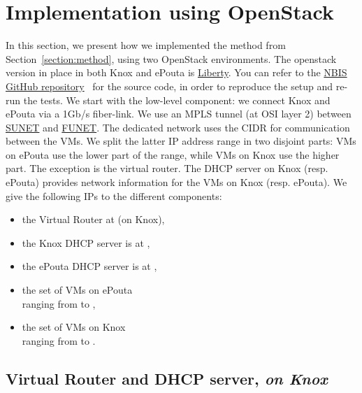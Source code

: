 \section{Implementation using OpenStack}
\label{section:implementation}

In this section, we present how we implemented the method from
Section~\ref{section:method}, using two OpenStack environments.
%
The openstack version in place in both Knox and ePouta is
\href{http://docs.openstack.org/liberty/install-guide-ubuntu/}{Liberty}.
%
%
You can refer to the
\href{https://github.com/NBISweden/Knox-ePouta}{NBIS GitHub
  repository}~\cite{nbis-knox-epouta} for the source code, in order to
reproduce the setup and re-run the tests.
%
We start with the low-level component: we connect Knox
and ePouta via a 1Gb/s fiber-link.
%
We use an MPLS tunnel (at OSI layer 2) between
\href{https://www.sunet.se/}{SUNET} and
\href{https://www.csc.fi/funet-network-services}{FUNET}.
%
The dedicated network uses the  CIDR for communication
between the VMs.
%
We split the latter IP address range in two disjoint parts: VMs on
ePouta use the lower part of the range, while VMs on Knox use the
higher part. The exception is the virtual router.
%
The DHCP server on Knox (resp. ePouta) provides network information
for the VMs on Knox (resp. ePouta).
%
We give the following IPs to the different components:
%
\begin{itemize}
\item the Virtual Router at  (on Knox),
\item the Knox DHCP server is at ,
\item the ePouta DHCP server is at ,
\item the set of VMs on ePouta\\ranging from  to ,%
\item the set of VMs on Knox\\ranging from  to .
\end{itemize}

\subsection{Virtual Router and DHCP server, \emph{on Knox}}
\label{section:implementation:virtual:router}
\label{section:implementation:dhcp:server:knox}

